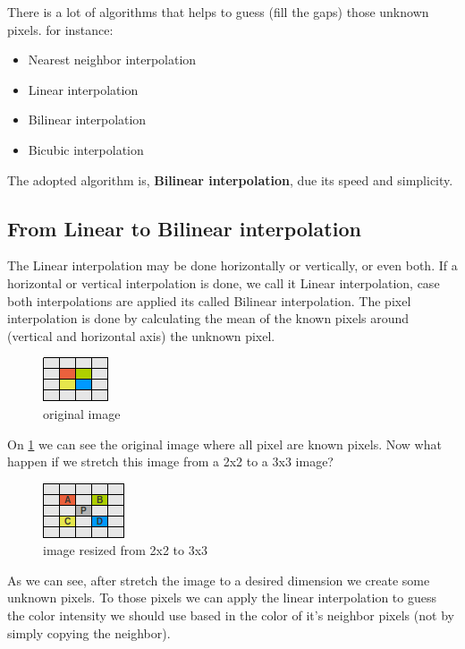 \documentclass{article}
\begin{document}
	There is a lot of algorithms that helps to guess (fill the gaps) those unknown pixels. for instance:

	\begin{itemize}
	  \item Nearest neighbor interpolation
	  \item Linear interpolation
	  \item Bilinear interpolation
	  \item Bicubic interpolation
	\end{itemize}

	The adopted algorithm is, \textbf{Bilinear interpolation},  due its speed and simplicity.
	
\subsection{From Linear to Bilinear interpolation}

	The Linear interpolation may be done horizontally or vertically, or even both. If a horizontal or vertical interpolation is done, we call it
	Linear interpolation, case both interpolations are applied its called Bilinear interpolation.	
	The pixel interpolation is done by calculating the mean of the known pixels around (vertical and horizontal axis) the unknown pixel. 

	\begin{figure} [H]
		\centering
		\includegraphics[scale=1]{images/bilinear_interpolation_1}
		\caption{original image \label{bilinear1}}
	\end{figure}

	On \ref{bilinear1} we can see the original image where all pixel are known pixels. Now what happen if we stretch this image 
	from a 2x2 to a 3x3 image?
	
	\begin{figure} [H]
		\centering
		\includegraphics[scale=1]{images/bilinear_interpolation_2}
		\caption{image resized from 2x2 to 3x3 \label{bilinear2}}
	\end{figure}

	As we can see, after stretch the image to a desired dimension we create some unknown pixels. To those pixels we can apply the linear interpolation 
	to guess the color intensity we should use based in the color of it's neighbor pixels (not by simply copying the neighbor).
\end{document}
